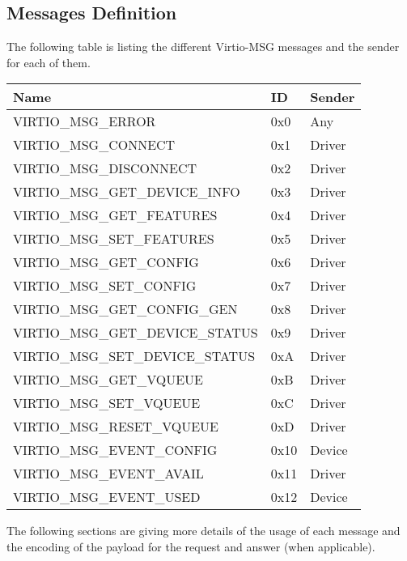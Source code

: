\subsection{Messages Definition}\label{sec:Virtio Transport Options / Virtio Over Messages / Messages Definition}

The following table is listing the different Virtio-MSG messages and the sender
for each of them.

\begin{tabular}{|l|l|l|}
\hline
Name & ID & Sender \\
\hline
\hline
VIRTIO_MSG_ERROR               & 0x0  & Any    \\
\hline
VIRTIO_MSG_CONNECT             & 0x1  & Driver \\
\hline
VIRTIO_MSG_DISCONNECT          & 0x2  & Driver \\
\hline
VIRTIO_MSG_GET_DEVICE_INFO   & 0x3  & Driver \\
\hline
VIRTIO_MSG_GET_FEATURES       & 0x4  & Driver \\
\hline
VIRTIO_MSG_SET_FEATURES       & 0x5  & Driver \\
\hline
VIRTIO_MSG_GET_CONFIG         & 0x6  & Driver \\
\hline
VIRTIO_MSG_SET_CONFIG         & 0x7  & Driver \\
\hline
VIRTIO_MSG_GET_CONFIG_GEN    & 0x8  & Driver \\
\hline
VIRTIO_MSG_GET_DEVICE_STATUS & 0x9  & Driver \\
\hline
VIRTIO_MSG_SET_DEVICE_STATUS & 0xA  & Driver \\
\hline
VIRTIO_MSG_GET_VQUEUE         & 0xB  & Driver \\
\hline
VIRTIO_MSG_SET_VQUEUE         & 0xC  & Driver \\
\hline
VIRTIO_MSG_RESET_VQUEUE       & 0xD  & Driver \\
\hline
VIRTIO_MSG_EVENT_CONFIG       & 0x10 & Device \\
\hline
VIRTIO_MSG_EVENT_AVAIL        & 0x11 & Driver \\
\hline
VIRTIO_MSG_EVENT_USED         & 0x12 & Device \\
\hline
\end{tabular}

The following sections are giving more details of the usage of each message
and the encoding of the payload for the request and answer (when applicable).

\newcommand{\msgdef}[1]{\subsubsection{VIRTIO_MSG_#1}\label{sec:Virtio Transport Options / Virtio Over Messages / Messages Definition / VIRTIO_MSG_#1}}

